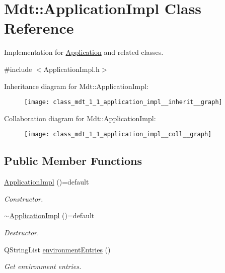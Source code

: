 \hypertarget{class_mdt_1_1_application_impl}{}\section{Mdt\+:\+:Application\+Impl Class Reference}
\label{class_mdt_1_1_application_impl}


Implementation for \hyperlink{class_mdt_1_1_application}{Application} and related classes.  




{\ttfamily \#include $<$Application\+Impl.\+h$>$}



Inheritance diagram for Mdt\+:\+:Application\+Impl\+:\nopagebreak
\begin{figure}[H]
\begin{center}
\leavevmode
\texttt{[image: class\_mdt\_1\_1\_application\_impl\_\_inherit\_\_graph]}
\end{center}
\end{figure}


Collaboration diagram for Mdt\+:\+:Application\+Impl\+:\nopagebreak
\begin{figure}[H]
\begin{center}
\leavevmode
\texttt{[image: class\_mdt\_1\_1\_application\_impl\_\_coll\_\_graph]}
\end{center}
\end{figure}
\subsection*{Public Member Functions}
\begin{DoxyCompactItemize}
\item 
\hyperlink{class_mdt_1_1_application_impl_a512c94eac0af0b0fb9ecd76af49fa473}{Application\+Impl} ()=default
\begin{DoxyCompactList}\small\item\em Constructor. \end{DoxyCompactList}\item 
\hyperlink{class_mdt_1_1_application_impl_aacb32f587d7f8da64472026e8cf28f3c}{$\sim$\+Application\+Impl} ()=default
\begin{DoxyCompactList}\small\item\em Destructor. \end{DoxyCompactList}\item 
Q\+String\+List \hyperlink{class_mdt_1_1_application_impl_a50deab1146432008cfed699c817dd315}{environment\+Entries} ()
\begin{DoxyCompactList}\small\item\em Get environment entries. \end{DoxyCompactList}\end{DoxyCompactItemize}
